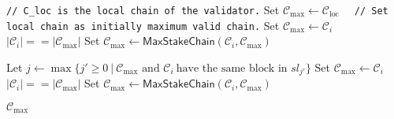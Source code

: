 \begin{algorithm}[ht]
    \begin{algorithmic}[1]
        \caption{${\textsf{MaxValidChain}(\mathcal{C}_{\text{loc}}, C_{\text{set}} = \{\mathcal{C}_i\}_{i=1}^N, K_{\text{f}}, K_{\text{g}})}$}
        \State \lstinline|// C_loc is the local chain of the validator.|
        \State Set ${\mathcal{C}_{\max} \leftarrow \mathcal{C}_{\text{loc}}}$
        \lstinline|  // Set local chain as initially maximum valid chain.|
                    \State Set ${\mathcal{C}_{\max} \leftarrow \mathcal{C}_{i}}$
                \ElsIf
                        {$|\mathcal{C}_i| == |\mathcal{C}_{\max}|$}
                    \State Set ${\mathcal{C}_{\max} \leftarrow \textsf{MaxStakeChain}(\mathcal{C}_{i}, \mathcal{C}_{\max})}$

                \EndIf
            \Else

                \State Let ${j  \leftarrow \max \{j' \geq 0 \ |\  \mathcal{C}_{\max} \text{ and } \mathcal{C}_{i} \
                \text{have the same block in } sl_{j'}\}}$
                    \State Set ${\mathcal{C}_{\max} \leftarrow \mathcal{C}_{i}}$
                \ElsIf
                        {$|\mathcal{C}_i| == |\mathcal{C}_{\max}|$}
                    \State Set ${\mathcal{C}_{\max} \leftarrow \textsf{MaxStakeChain}(\mathcal{C}_{i}, \mathcal{C}_{\max})}$
                \EndIf
            \EndIf

        \EndFor
        \State \Return ${\mathcal{C}_{\max}}$
    \end{algorithmic}\label{alg:algorithm-1}
\end{algorithm}


